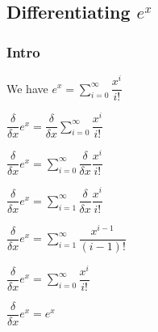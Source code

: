 
\subsection{Differentiating \(e^x\)}

\subsubsection{Intro}

We have \(e^x=\sum^{\infty }_{i=0} \dfrac{x^i}{i!}\)

\(\dfrac{\delta }{\delta x}e^x=\dfrac{\delta }{\delta x}\sum^{\infty }_{i=0} \dfrac{x^i}{i!}\)

\(\dfrac{\delta }{\delta x}e^x=\sum^{\infty }_{i=0} \dfrac{\delta }{\delta x}\dfrac{x^i}{i!}\)

\(\dfrac{\delta }{\delta x}e^x=\sum^{\infty }_{i=1} \dfrac{\delta }{\delta x}\dfrac{x^i}{i!}\)

\(\dfrac{\delta }{\delta x}e^x=\sum^{\infty }_{i=1} \dfrac{x^{i-1}}{(i-1)!}\)

\(\dfrac{\delta }{\delta x}e^x=\sum^{\infty }_{i=0} \dfrac{x^{i}}{i!}\)

\(\dfrac{\delta }{\delta x}e^x=e^x\)


